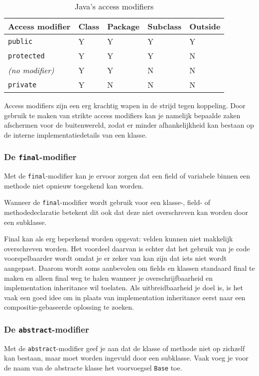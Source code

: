 \begin{table}[H]
    \centering
    \begin{tabularx}{\textwidth}{
        |>{\raggedright}l|>{\raggedright}X|>{\raggedright}X|>{\raggedright}X|>{\raggedright\arraybackslash}X|
    }
    \hline
    \textbf{Access modifier} & \textbf{Class} & \textbf{Package} & \textbf{Subclass} & \textbf{Outside} \\ \hline
        \texttt{public} & Y & Y & Y & Y \\ \hline
        \texttt{protected} & Y & Y & Y & N \\ \hline
        \textit{(no modifier)} & Y & Y & N & N \\ \hline
        \texttt{private} & Y & N & N & N \\ \hline
    \end{tabularx}
    \caption{Java's access modifiers}
    \label{table:access-modifiers}
    \centering
\end{table}

Access modifiers zijn een erg krachtig wapen in de strijd tegen koppeling. 
Door gebruik te maken van 
strikte access modifiers kan je namelijk bepaalde zaken afschermen voor de buitenwereld, 
zodat er minder afhankelijkheid kan bestaan
op de interne implementatiedetails van een klasse.

\subsubsection{De \texttt{final}-modifier}
Met de \texttt{final}-modifier kan je ervoor zorgen dat 
een field of variabele binnen een methode niet opnieuw toegekend 
kan worden. 

Wanneer de \texttt{final}-modifier wordt gebruik voor een 
klasse-, field- of methodedeclaratie betekent dit ook dat deze niet 
overschreven kan worden door een subklasse.

Final kan als erg beperkend worden opgevat: velden kunnen niet makkelijk 
overschreven worden. Het voordeel daarvan is echter dat het gebruik van je code 
voorspelbaarder wordt omdat je er zeker van kan zijn dat iets niet wordt aangepast.
Daarom wordt soms aanbevolen om fields en klassen standaard 
final te maken en alleen final weg te halen wanneer je overschrijfbaarheid
en implementation inheritance wil toelaten. 
Als uitbreidbaarheid je doel is, is het vaak 
een goed idee om in plaats van implementation inheritance eerst  
naar een compositie-gebaseerde oplossing te zoeken.

\subsubsection{De \texttt{abstract}-modifier}
Met de \texttt{abstract}-modifier geef je aan dat de klasse of 
methode niet op zichzelf kan bestaan, maar moet worden ingevuld
door een subklasse. Vaak voeg je voor de naam van de abstracte klasse
het voorvoegsel \texttt{Base} toe.

